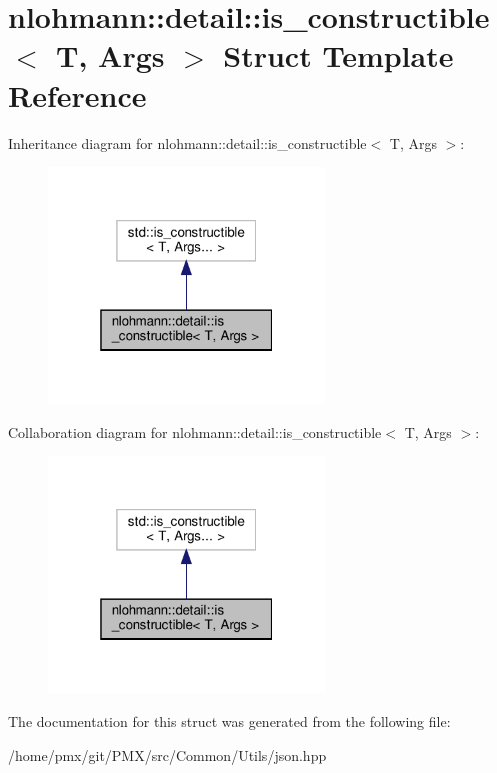 \hypertarget{structnlohmann_1_1detail_1_1is__constructible}{}\section{nlohmann\+:\+:detail\+:\+:is\+\_\+constructible$<$ T, Args $>$ Struct Template Reference}
\label{structnlohmann_1_1detail_1_1is__constructible}


Inheritance diagram for nlohmann\+:\+:detail\+:\+:is\+\_\+constructible$<$ T, Args $>$\+:
\nopagebreak
\begin{figure}[H]
\begin{center}
\leavevmode
\includegraphics[width=208pt]{structnlohmann_1_1detail_1_1is__constructible__inherit__graph}
\end{center}
\end{figure}


Collaboration diagram for nlohmann\+:\+:detail\+:\+:is\+\_\+constructible$<$ T, Args $>$\+:
\nopagebreak
\begin{figure}[H]
\begin{center}
\leavevmode
\includegraphics[width=208pt]{structnlohmann_1_1detail_1_1is__constructible__coll__graph}
\end{center}
\end{figure}


The documentation for this struct was generated from the following file\+:\begin{DoxyCompactItemize}
\item 
/home/pmx/git/\+P\+M\+X/src/\+Common/\+Utils/json.\+hpp\end{DoxyCompactItemize}
